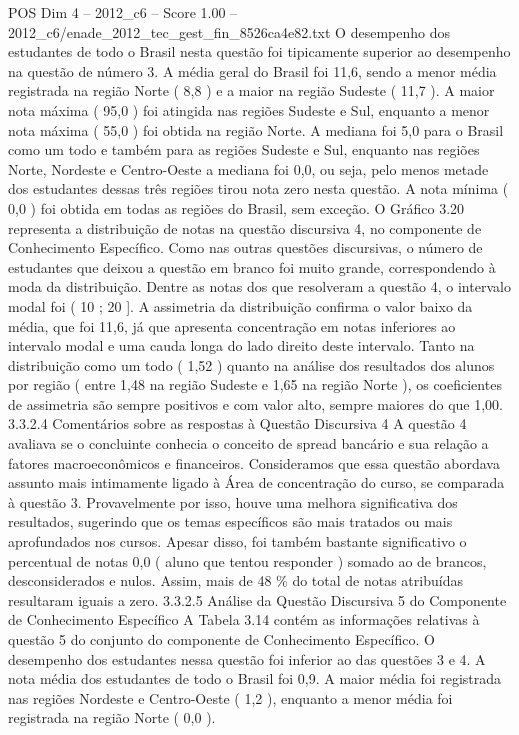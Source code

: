 \begin{textsample}{POS Dim 4 – 2012\_c6 – Score 1.00 – 2012\_c6/enade\_2012\_tec\_gest\_fin\_8526ca4e82.txt}
O desempenho dos estudantes de todo o Brasil nesta questão foi tipicamente superior ao desempenho na questão de número 3.
A média geral do Brasil foi 11,6, sendo a menor média registrada na região Norte ( 8,8 ) e a maior na região Sudeste ( 11,7 ).
A maior nota máxima ( 95,0 ) foi atingida nas regiões Sudeste e Sul, enquanto a menor nota máxima ( 55,0 ) foi obtida na região Norte.
A mediana foi 5,0 para o Brasil como um todo e também para as regiões Sudeste e Sul, enquanto nas regiões Norte, Nordeste e Centro-Oeste a mediana foi 0,0, ou seja, pelo menos metade dos estudantes dessas três regiões tirou nota zero nesta questão.
A nota mínima ( 0,0 ) foi obtida em todas as regiões do Brasil, sem exceção.
O Gráfico 3.20 representa a distribuição de notas na questão discursiva 4, no componente de Conhecimento Específico.
Como nas outras questões discursivas, o número de estudantes que deixou a questão em branco foi muito grande, correspondendo à moda da distribuição.
Dentre as notas dos que resolveram a questão 4, o intervalo modal foi ( 10 ; 20 ].
A assimetria da distribuição confirma o valor baixo da média, que foi 11,6, já que apresenta concentração em notas inferiores ao intervalo modal e uma cauda longa do lado direito deste intervalo.
Tanto na distribuição como um todo ( 1,52 ) quanto na análise dos resultados dos alunos por região ( entre 1,48 na região Sudeste e 1,65 na região Norte ), os coeficientes de assimetria são sempre positivos e com valor alto, sempre maiores do que 1,00. 3.3.2.4 Comentários sobre as respostas à Questão Discursiva 4 A questão 4 avaliava se o concluinte conhecia o conceito de spread bancário e sua relação a fatores macroeconômicos e financeiros.
Consideramos que essa questão abordava assunto mais intimamente ligado à Área de concentração do curso, se comparada à questão 3.
Provavelmente por isso, houve uma melhora significativa dos resultados, sugerindo que os temas específicos são mais tratados ou mais aprofundados nos cursos.
Apesar disso, foi também bastante significativo o percentual de notas 0,0 ( aluno que tentou responder ) somado ao de brancos, desconsiderados e nulos.
Assim, mais de 48 \% do total de notas atribuídas resultaram iguais a zero. 3.3.2.5 Análise da Questão Discursiva 5 do Componente de Conhecimento Específico A Tabela 3.14 contém as informações relativas à questão 5 do conjunto do componente de Conhecimento Específico.
O desempenho dos estudantes nessa questão foi inferior ao das questões 3 e 4.
A nota média dos estudantes de todo o Brasil foi 0,9.
A maior média foi registrada nas regiões Nordeste e Centro-Oeste ( 1,2 ), enquanto a menor média foi registrada na região Norte ( 0,0 ).

\end{textsample}
